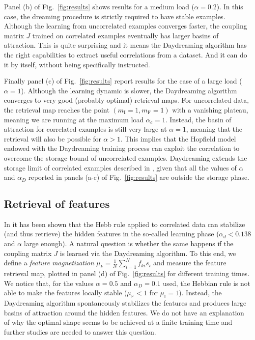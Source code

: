 \documentclass[a4paper]{cas-sc}
\newcommand{\mI}{m_\text{I}}
\newcommand{\mF}{m_\text{F}}
\begin{document}
Panel (b) of Fig.~\ref{fig:results} shows results for a medium load ($\alpha=0.2$). In this case, the dreaming procedure is strictly required to have stable examples. Although the learning from uncorrelated examples converges faster, the coupling matrix $J$ trained on correlated examples eventually has larger basins of attraction. This is quite surprising and it means the Daydreaming algorithm has the right capabilities to extract useful correlations from a dataset. And it can do it by itself, without being specifically instructed.

Finally panel (c) of Fig.~\ref{fig:results} report results for the case of a large load ($\alpha=1$). Although the learning dynamic is slower, the Daydreaming algorithm converges to very good (probably optimal) retrieval maps. For uncorrelated data, the retrieval map reaches the point $(\mI=1,\mF=1)$ with a vanishing plateau, meaning we are running at the maximum load $\alpha_c=1$. Instead, the basin of attraction for correlated examples is still very large at $\alpha=1$, meaning that the retrieval will also be possible for $\alpha > 1$. This implies that the Hopfield model endowed with the Daydreaming training process can exploit the correlation to overcome the storage bound of uncorrelated examples.
Daydreaming extends the storage limit of correlated examples described in \cite{negri2023storage}, given that all the values of $\alpha$ and $\alpha_D$ reported in panels (a-c) of Fig.~\ref{fig:results} are outside the storage phase.

\subsection{Retrieval of features}
In \cite{negri2023storage} it has been shown that the Hebb rule applied to correlated data can stabilize (and thus retrieve) the hidden features in the so-called learning phase ($\alpha_d<0.138$ and $\alpha$ large enough).
A natural question is whether the same happens if the coupling matrix $J$ is learned via the Daydreaming algorithm.
To this end, we define a \emph{feature magnetization} $\mu_k=\frac{1}{N} \sum_{i=1}^N f_{ki} s_i$ and measure the feature retrieval map, plotted in panel (d) of Fig.~\ref{fig:results} for different training times.
We notice that, for the values $\alpha=0.5$ and $\alpha_D=0.1$ used, the Hebbian rule is not able to make the features locally stable ($\mu_\text{F}<1$ for $\mu_\text{I}=1$). Instead, the Daydreaming algorithm spontaneously stabilizes the features and produces large basins of attraction around the hidden features.
We do not have an explanation of why the optimal shape seems to be achieved at a finite training time and further studies are needed to answer this question.
\end{document}
